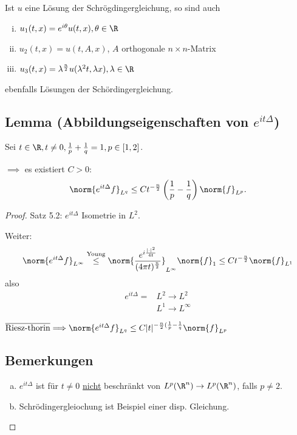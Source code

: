 Ist $u$ eine Lösung der Schrögdingergleichung, so sind auch 
\begin{enumerate}[(i)] 
\item $u_1(t,x) = e^{i\theta} u(t, x), \theta \in \R$ 
\item $u_2(t,x) = u(t, A,x)$, $A$ orthogonale $n\times n$-Matrix
\item $u_3(t, x) = \lambda^{\frac{n}{2}} u(\lambda^2 t, \lambda x), \lambda \in \R$
\end{enumerate}
ebenfalls Lösungen der Schördingergleichung.

\subsection{Lemma (Abbildungseigenschaften von $e^{it\Delta}$)}

Sei $t \in \R, t \neq 0, \frac{1}{p} + \frac{1}{q} = 1, p \in [1,2]$.

$\implies$ es existiert $C > 0$:
$$
\norm{e^{it\Delta} f}_{L^q} \leq C t^{-\frac{n}{2}} \left(\frac{1}{p} - \frac{1}{q}\right) \norm{f}_{L^p}.
$$

\begin{proof}
Satz 5.2: $e^{it\Delta}$ Isometrie in $L^2$.

Weiter:
$$
\norm{e^{it\Delta} f}_{L^\infty} \overset{\text{Young}}{\leq} \norm{\frac{e^{i\frac{|\cdot|^2}{4t}}}{(4\pi t)^{\frac{n}{2}}}}_{L^\infty} \norm{f}_1 \leq C t^{-\frac{n}{2}} \norm{f}_{L^1}
$$
also 
\begin{align*}
  e^{it\Delta} = &L^2 \to L^2 \\ &L^1 \to L^\infty
\end{align*}

$\overline{\text{Riesz-thorin}}{\implies} \norm{e^{it\Delta} f}_{L^q} \leq C |t|^{-\frac{n}{2}(\frac{1}{p} - \frac{1}{q}} \norm{f}_{L^p}$

\subsection{Bemerkungen}
\begin{enumerate}[a)]
\item $e^{it\Delta}$ ist für $t \neq 0$ \underline{nicht} beschränkt von $L^p(\R^n) \to L^p(\R^n)$, falls $p \neq 2$.
\item Schrödingergleiochung ist Beispiel einer disp. Gleichung.
\end{enumerate}
\end{proof}


